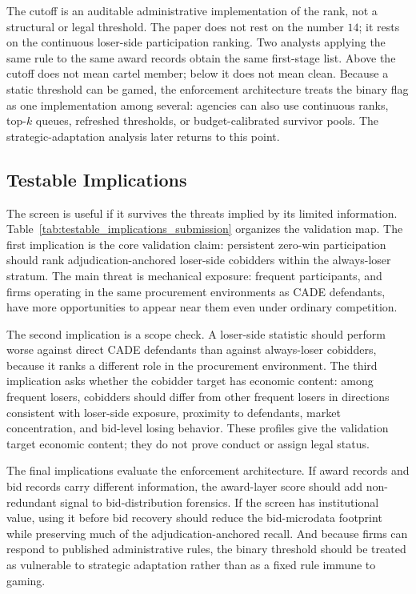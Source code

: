 The cutoff is an auditable administrative implementation of the
rank, not a structural or legal threshold. The paper does not
rest on the number $14$; it rests on the continuous loser-side
participation ranking. Two analysts applying the same rule to
the same award records obtain the same first-stage list. Above
the cutoff does not mean cartel member; below it does not mean
clean. Because a static threshold can be gamed, the enforcement
architecture treats the binary flag as one implementation among
several: agencies can also use continuous ranks, top-$k$ queues,
refreshed thresholds, or budget-calibrated survivor pools. The
strategic-adaptation analysis later returns to this point.

\subsection{Testable Implications}
\label{sec:testable_implications}

The screen is useful if it survives the threats implied by its
limited information. Table~\ref{tab:testable_implications_submission}
organizes the validation map. The first implication is the core
validation claim: persistent zero-win participation should rank
adjudication-anchored loser-side cobidders within the always-loser
stratum. The main threat is mechanical exposure: frequent
participants, and firms operating in the same procurement
environments as CADE defendants, have more opportunities to
appear near them even under ordinary competition.

The second implication is a scope check. A loser-side statistic
should perform worse against direct CADE defendants than against
always-loser cobidders, because it ranks a different role in the
procurement environment. The third implication asks whether the
cobidder target has economic content: among frequent losers,
cobidders should differ from other frequent losers in directions
consistent with loser-side exposure, proximity to defendants,
market concentration, and bid-level losing behavior. These
profiles give the validation target economic content; they do
not prove conduct or assign legal status.

The final implications evaluate the enforcement architecture.
If award records and bid records carry different information,
the award-layer score should add non-redundant signal to
bid-distribution forensics. If the screen has institutional
value, using it before bid recovery should reduce the
bid-microdata footprint while preserving much of the
adjudication-anchored recall. And because firms can respond to
published administrative rules, the binary threshold should be
treated as vulnerable to strategic adaptation rather than as a
fixed rule immune to gaming.

